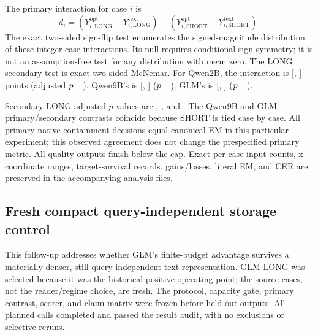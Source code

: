 The primary interaction for case $i$ is
\[
d_i=(Y^{\mathrm{opt}}_{i,\mathrm{LONG}}-Y^{\mathrm{text}}_{i,\mathrm{LONG}})
 -(Y^{\mathrm{opt}}_{i,\mathrm{SHORT}}-Y^{\mathrm{text}}_{i,\mathrm{SHORT}}).
\]
The exact two-sided sign-flip test enumerates the signed-magnitude distribution of these integer case interactions. Its null requires conditional sign symmetry; it is not an assumption-free test for any distribution with mean zero. The LONG secondary test is exact two-sided McNemar. For Qwen2B, the interaction is  [, ] points (adjusted $p=\nval{budget.Qwen2B.primary_interaction.holm}$). Qwen9B's is  [, ] ($p=\nval{budget.Qwen9B.primary_interaction.holm}$). GLM's is  [, ] ($p=\nval{budget.GLM.primary_interaction.holm}$).

Secondary LONG adjusted $p$ values are , , and . The Qwen9B and GLM primary/secondary contrasts coincide because SHORT is tied case by case. All primary native-containment decisions equal canonical EM in this particular experiment; this observed agreement does not change the prespecified primary metric. All quality outputs finish below the cap. Exact per-case input counts, x-coordinate ranges, target-survival records, gains/losses, literal EM, and CER are preserved in the accompanying analysis files.


\subsection{Fresh compact query-independent storage control}
\label{app:compact}
This follow-up addresses whether GLM's finite-budget advantage survives a materially denser, still query-independent text representation. GLM LONG was selected because it was the historical positive operating point; the source cases, not the reader/regime choice, are fresh. The protocol, capacity gate, primary contrast, scorer, and claim matrix were frozen before held-out outputs. All  planned calls completed and passed the result audit, with no exclusions or selective reruns.


